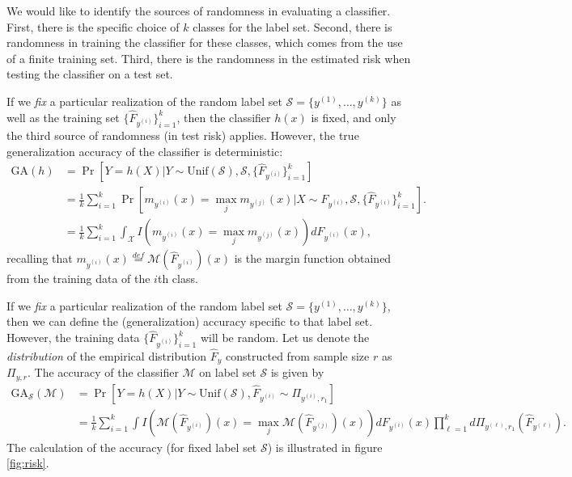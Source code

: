 \documentclass[12pt]{article}
\begin{document}
We would like to identify the sources of randomness in evaluating a
classifier.  First, there is the specific choice of $k$ classes for
the label set.   Second, there is randomness in training the classifier
for these classes, which comes from the use of a finite training
set. Third, there is the randomness in the estimated risk when
testing the classifier on a test set.

If we \emph{fix} a particular realization of the random label set
$\mathcal{S} = \{y^{(1)}, \hdots, y^{(k)}\}$ as well as the training
set $\{\hat{F}_{y^{(i)}}\}_{i=1}^k$, then the classifier $h(x)$ is
fixed, and only the third source of randomness (in test risk) applies.
However, the true generalization accuracy of the classifier is deterministic:
\begin{align*}
\text{GA}(h) &= \Pr[Y = h(X)|Y \sim \text{Unif}(\mathcal{S}),
  \mathcal{S}, \{\hat{F}_{y^{(i)}}\}_{i=1}^k] 
\\&= \frac{1}{k}
\sum_{i=1}^k \Pr[m_{y^{(i)}}(x) = \max_j m_{y^{(j)}}(x)|X \sim
  F_{y^{(i)}}, \mathcal{S}, \{\hat{F}_{y^{(i)}}\}_{i=1}^k].  
\\&= \frac{1}{k}
\sum_{i=1}^k \int_{\mathcal{X}} I(m_{y^{(i)}}(x) = \max_j m_{y^{(j)}}(x)) dF_{y^{(i)}}(x),
\end{align*}
recalling that $m_{y^{(i)}}(x) \stackrel{def}{=}
\mathcal{M}(\hat{F}_{y^{(i)}})(x)$ is the margin function obtained
from the training data of the $i$th class.

If we \emph{fix} a particular realization of the random label set
$\mathcal{S} = \{y^{(1)}, \hdots, y^{(k)}\}$, then we can define the
(generalization) accuracy specific to that label set.  However, the
training data $\{\hat{F}_{y^{(i)}}\}_{i=1}^k$ will be random.  Let us
denote the \emph{distribution} of the empirical distribution
$\hat{F}_y$ constructed from sample size $r$ as $\Pi_{y, r}$.  The
accuracy of the classifier $\mathcal{M}$ on label set $\mathcal{S}$ is
given by
\begin{align*}
\text{GA}_{\mathcal{S}}(\mathcal{M}) &= \Pr[Y = h(X)|Y \sim
  \text{Unif}(\mathcal{S}), \hat{F}_{y^{(i)}} \sim \Pi_{y^{(i)}, r_1}] \\&= \frac{1}{k} \sum_{i=1}^k \int
I(\mathcal{M}(\hat{F}_{y^{(i)}})(x) = \max_j
\mathcal{M}(\hat{F}_{y^{(j)}})(x)) dF_{y^{(i)}}(x) \prod_{\ell=1}^k
d\Pi_{y^{(\ell)}, r_1}(\hat{F}_{y^{(\ell)}}).
\end{align*}
The calculation of the accuracy (for fixed label set $\mathcal{S}$) is
illustrated in figure \ref{fig:risk}.
\end{document}
